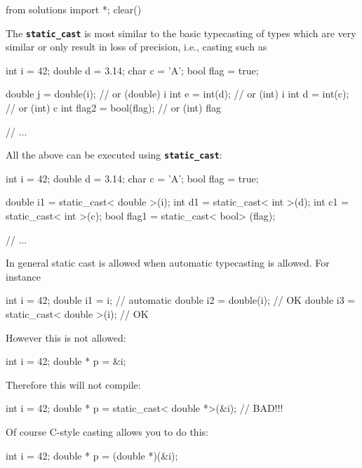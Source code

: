 \begin{python0}
from solutions import *; clear()
\end{python0}

The \texttt{\textbf{static\_cast}} is most similar to the basic
typecasting of types which are very similar or only result in loss of
precision, i.e., casting such as
\begin{console}
int i = 42;
double d = 3.14;
char c = 'A';
bool flag = true;

double j = double(i);        // or (double) i
int e = int(d);              // or (int) i
int d = int(c);              // or (int) c
int flag2 = bool(flag);      // or (int) flag

// ...
\end{console}
All the above can be executed using \textbf{\texttt{static\_cast}}:

\begin{console}
int i = 42;
double d = 3.14;
char c = 'A';
bool flag = true;

double i1 = static_cast< double >(i);
int d1 = static_cast< int >(d);
int c1 = static_cast< int >(c);
bool flag1 = static_cast< bool> (flag);

// ...
\end{console}

In general static cast is allowed when automatic typecasting is allowed.
For instance

\begin{console}
int i = 42;
double i1 = i;                        // automatic
double i2 = double(i);                // OK
double i3 = static_cast< double >(i); // OK
\end{console}

However this is not allowed:

\begin{console}
int i = 42;
double * p = &i;
\end{console}

Therefore this will not compile:

\begin{console}
int i = 42;
double * p = static_cast< double *>(&i); // BAD!!!
\end{console}

Of course C-style casting allows you to do this:

\begin{console}
int i = 42;
double * p = (double *)(&i);
\end{console}

